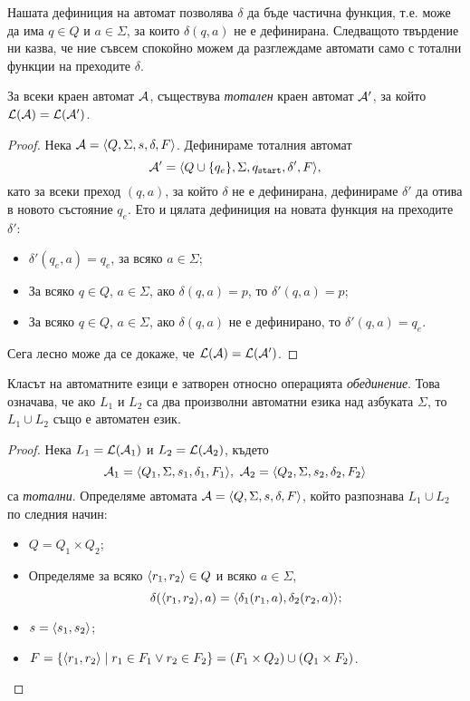 Нашата дефиниция на автомат позволява $\delta$ да бъде частична функция, т.е.
може да има $q\in Q$ и $a\in\Sigma$, за които $\delta(q,a)$ не е дефинирана.
Следващото твърдение ни казва, че ние съвсем спокойно можем да разглеждаме автомати
само с тотални функции на преходите  $\delta$.
\begin{prop}
  За всеки краен автомат $\mathcal{A}$, съществува {\em тотален} краен автомат $\mathcal{A}'$,
  за който $\mathcal{L}(\mathcal{A}) = \mathcal{L}(\mathcal{A}')$.
\end{prop}
\begin{proof}
  Нека $\mathcal{A} = \langle{Q,\Sigma,s,\delta,F}\rangle$.
  Дефинираме тоталния автомат 
  \[\mathcal{A}' = \langle{Q\cup\{q_e\}, \Sigma, q_{\texttt{start}}, \delta', F}\rangle,\]
  като за всеки преход $(q,a)$, за който $\delta$ не е дефинирана, 
  дефинираме $\delta'$ да отива в новото състояние $q_e$.
  Ето и цялата дефиниция на новата функция на преходите $\delta'$:
  \begin{itemize}
  \item 
    $\delta'(q_e,a) = q_e$, за всяко $a\in\Sigma$;
  \item
    За всяко $q\in Q$, $a\in\Sigma$, ако $\delta(q,a) = p$, то
    $\delta'(q,a) = p$;
  \item
    За всяко $q\in Q$, $a\in\Sigma$, ако $\delta(q,a)$ не е дефинирано, то
    $\delta'(q,a) = q_e$.
  \end{itemize}
  Сега лесно може да се докаже, че $\mathcal{L}(\mathcal{A}) = \mathcal{L}(\mathcal{A}')$.
\end{proof}

\begin{prop}
  \label{pr:automata-union}
  Класът на автоматните езици е затворен относно операцията {\em обединение}.
  Това означава, че ако $L_1$ и $L_2$ са два произволни автоматни езика над азбуката $\Sigma$, то $L_1\cup L_2$
  също е автоматен език.
\end{prop}
\begin{proof}
  Нека $L_1 = \mathcal{L}(\mathcal{A}_1)$ и $L_2 = \mathcal{L}(\mathcal{A}_2)$, 
  където \[\mathcal{A}_1 = \langle{Q_1,\Sigma,s_1,\delta_1,F_1}\rangle,\ \mathcal{A}_2 = \langle{Q_2,\Sigma,s_2,\delta_2,F_2}\rangle\] са {\em тотални}.
  Определяме автомата $\mathcal{A} = \langle{Q,\Sigma,s,\delta,F}\rangle$, който разпознава $L_1\cup L_2$ по следния начин:
  \begin{itemize}
  \item
    $Q = Q_1\times Q_2$;
  \item
    Определяме за всяко $\langle{r_1,r_2}\rangle \in Q$ и всяко $a \in \Sigma$,
    \[\delta(\langle{r_1,r_2}\rangle,a) = \langle{\delta_1(r_1,a),\delta_2(r_2,a)}\rangle;\]
  \item
    $s = \langle{s_1,s_2}\rangle$;
  \item
    $F = \{\langle{r_1,r_2}\rangle\mid r_1\in F_1\vee r_2 \in F_2\} = (F_1\times Q_2)\cup (Q_1\times F_2)$.
  \end{itemize}
\end{proof}

